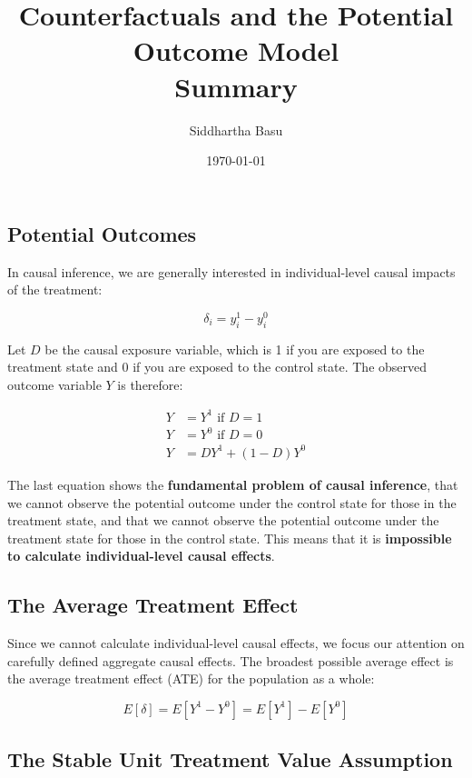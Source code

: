 \documentclass[12 pt, leqno]{article}
\begin{document}
\title{Counterfactuals and the Potential Outcome Model \\ Summary}
\author{Siddhartha Basu}
\date{\today}
\maketitle

\subsection{Potential Outcomes}
In causal inference, we are generally interested in individual-level causal impacts of the treatment:

$$ \delta_i = y_i^1 - y_i^0 $$

Let $D$ be the causal exposure variable, which is 1 if you are exposed to the treatment state and 0 if you are exposed to the control state. The observed outcome variable $Y$ is therefore:

\begin{align*}
Y &= Y^1  \text{      if  } D = 1 \\
Y &= Y^0  \text{      if  } D = 0 \\
Y &= D Y^1 + (1 - D) Y^0
\end{align*}

The last equation shows the \textbf{fundamental problem of causal inference}, that we cannot observe the potential outcome under the control state for those in the treatment state, and that we cannot observe the potential outcome under the treatment state for those in the control state. This means that it is \textbf{impossible to calculate individual-level causal effects}.

\subsection{The Average Treatment Effect}

Since we cannot calculate individual-level causal effects, we focus our attention on carefully defined aggregate causal effects. The broadest possible average effect is the average treatment effect (ATE) for the population as a whole:

$$E[\delta] = E[Y^1 - Y^0] = E[Y^1] - E[Y^0]$$

\subsection{The Stable Unit Treatment Value Assumption}
\end{document}
